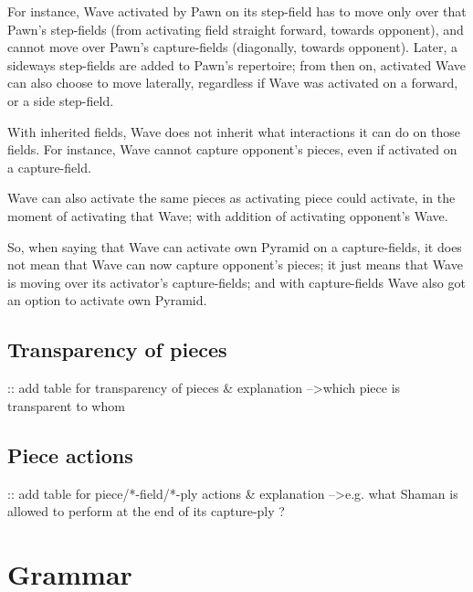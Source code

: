 For instance, Wave activated by Pawn on its step-field has to move only over that
Pawn's step-fields (from activating field straight forward, towards opponent), and
cannot move over Pawn's capture-fields (diagonally, towards opponent). Later, a
sideways step-fields are added to Pawn's repertoire; from then on, activated Wave
can also choose to move laterally, regardless if Wave was activated on a forward,
or a side step-field.

With inherited fields, Wave does not inherit what interactions it can do on those
fields. For instance, Wave cannot capture opponent's pieces, even if activated on
a capture-field.

Wave can also activate the same pieces as activating piece could activate, in the
moment of activating that Wave; with addition of activating opponent's Wave.

So, when saying that Wave can activate own Pyramid on a capture-fields, it does
not mean that Wave can now capture opponent's pieces; it just means that Wave is
moving over its activator's capture-fields; and with capture-fields Wave also got
an option to activate own Pyramid.

\clearpage %

\subsection*{Transparency of pieces}
\label{sec:Appendix/Summary/Transparency of pieces}

\TODO :: add table for transparency of pieces \& explanation
      --\textgreater which piece is transparent to whom

\clearpage %

\subsection*{Piece actions}
\label{sec:Appendix/Summary/Piece actions}

\TODO :: add table for piece/*-field/*-ply actions \& explanation
      --\textgreater e.g. what Shaman is allowed to perform at the end of its capture-ply ?

\clearpage %

\section*{Grammar}
\label{sec:Appendix/Grammar}

